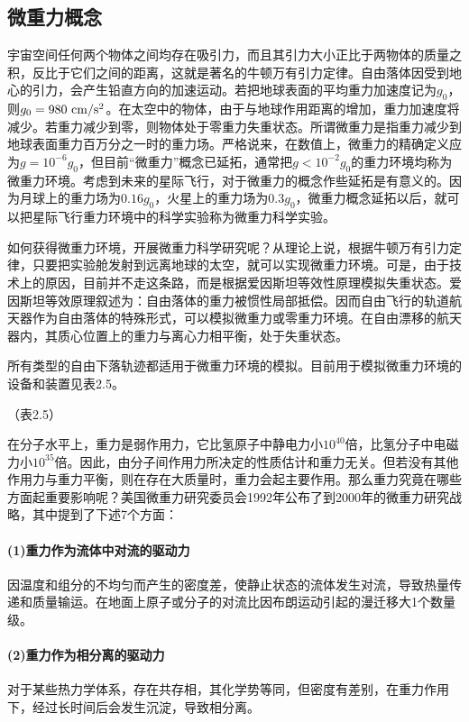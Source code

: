 \subsection{微重力概念}
宇宙空间任何两个物体之间均存在吸引力，而且其引力大小正比于两物体的质量之积，反比于它们之间的距离，这就是著名的牛顿万有引力定律。自由落体因受到地心的引力，会产生铅直方向的加速运动。若把地球表面的平均重力加速度记为$g_0$，则$g_0=980 \rm\ cm/s^2$。在太空中的物体，由于与地球作用距离的增加，重力加速度将减少。若重力减少到零，则物体处于零重力失重状态。所谓微重力是指重力减少到地球表面重力百万分之一时的重力场。严格说来，在数值上，微重力的精确定义应为$g=10^{-6}g_0$，但目前“微重力”概念已延拓，通常把$g<10^{-2}g_0$的重力环境均称为微重力环境。考虑到未来的星际飞行，对于微重力的概念作些延拓是有意义的。因为月球上的重力场为$0.16g_0$，火星上的重力场为$0.3g_0$，微重力概念延拓以后，就可以把星际飞行重力环境中的科学实验称为微重力科学实验。

如何获得微重力环境，开展微重力科学研究呢？从理论上说，根据牛顿万有引力定律，只要把实验舱发射到远离地球的太空，就可以实现微重力环境。可是，由于技术上的原因，目前并不走这条路，而是根据爱因斯坦等效性原理模拟失重状态。爱因斯坦等效原理叙述为：自由落体的重力被惯性局部抵偿。因而自由飞行的轨道航天器作为自由落体的特殊形式，可以模拟微重力或零重力环境。在自由漂移的航天器内，其质心位置上的重力与离心力相平衡，处于失重状态。

所有类型的自由下落轨迹都适用于微重力环境的模拟。目前用于模拟微重力环境的设备和装置见表2.5。

（表2.5）

在分子水平上，重力是弱作用力，它比氢原子中静电力小$10^{40}$倍，比氢分子中电磁力小$10^35$倍。因此，由分子间作用力所决定的性质估计和重力无关。但若没有其他作用力与重力平衡，则在存在大质量时，重力会起主要作用。那么重力究竟在哪些方面起重要影响呢？美国微重力研究委员会1992年公布了到2000年的微重力研究战略，其中提到了下述7个方面：

\paragraph{(1)重力作为流体中对流的驱动力}因温度和组分的不均匀而产生的密度差，使静止状态的流体发生对流，导致热量传递和质量输运。在地面上原子或分子的对流比因布朗运动引起的漫迁移大1个数量级。
\paragraph{(2)重力作为相分离的驱动力}对于某些热力学体系，存在共存相，其化学势等同，但密度有差别，在重力作用下，经过长时间后会发生沉淀，导致相分离。
